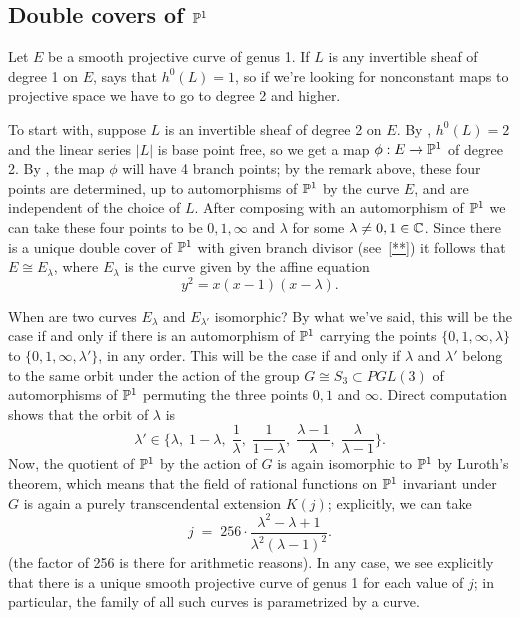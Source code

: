\subsection{Double covers of ${\mathbb P}^1$}

Let $E$ be a smooth projective curve of genus 1. If $L$ is any invertible sheaf of degree 1 on $E$, \trr says that $h^0(L) = 1$, so if we're looking for nonconstant maps to projective space we have to go to degree 2 and higher.

To start with, suppose $L$ is an invertible sheaf of degree 2 on $E$. By \trr, $h^0(L) = 2$ and the linear series $|L|$ is base point free, so we get a map $\phi : E \to {\mathbb P}^1$ of degree 2. By \trh, the map $\phi$ will have 4 branch points; by the remark above, these four points are determined, up to automorphisms of ${\mathbb P}^1$ by the curve $E$, and are independent of the choice of $L$.
After composing with an automorphism of ${\mathbb P}^1$ we can take these four points to be $0, 1, \infty$ and $\lambda$ for some $\lambda \neq 0, 1 \in {\mathbb C}$. Since there is a unique double cover of ${\mathbb P}^1$ with given branch divisor (see~\ref{**}) it follows that $E \cong E_\lambda$, where $E_\lambda$ is the curve given by the affine equation
$$
y^2 = x(x-1)(x-\lambda).
$$

When are two curves $E_\lambda$ and $E_{\lambda'}$ isomorphic? By what we've said, this will be the case if and only if there is an automorphism of ${\mathbb P}^1$ carrying the points $\{0,1,\infty,\lambda\}$ to $\{0,1,\infty,\lambda'\}$, in any order. This will be the case if and only if $\lambda$ and $\lambda'$ belong to the same orbit under the action of the group $G \cong S_3 \subset PGL(3)$ of automorphisms of ${\mathbb P}^1$ permuting the three points $0, 1$ and $\infty$. Direct computation shows that the orbit of $\lambda$ is
$$
\lambda' \in \{\lambda, \; 1-\lambda, \; \frac{1}{\lambda},\;  \frac{1}{1-\lambda}, \; \frac{\lambda - 1}{\lambda}, \; \frac{\lambda}{\lambda - 1} \}.
$$
Now, the quotient of ${\mathbb P}^1$ by the action of $G$ is again isomorphic to ${\mathbb P}^1$ by Luroth's theorem, which means that the field of rational functions on ${\mathbb P}^1$ invariant under $G$ is again a purely transcendental extension $K(j)$; explicitly, we can take
$$
j \; = \; 256\cdot \frac{\lambda^2 - \lambda + 1}{\lambda^2(\lambda - 1)^2}.
$$
(the factor of 256 is there for arithmetic reasons). In any case, we see explicitly that there is a unique smooth projective curve of genus 1 for each value of $j$; in particular, the family of all such curves is parametrized by a curve.

